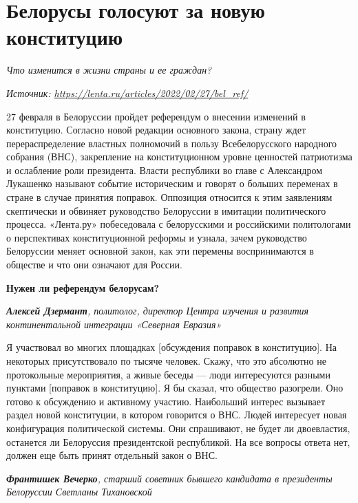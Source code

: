 
\section{Белорусы голосуют за новую конституцию}

\textit{Что изменится в жизни страны и ее граждан?}

\textit{Источник: \url{https://lenta.ru/articles/2022/02/27/bel_ref/}}

27 февраля в Белоруссии пройдет референдум о внесении изменений в конституцию. Согласно новой редакции основного закона, страну ждет перераспределение властных полномочий в пользу Всебелорусского народного собрания (ВНС), закрепление на конституционном уровне ценностей патриотизма и ослабление роли президента. Власти республики во главе с Александром Лукашенко называют событие историческим и говорят о больших переменах в стране в случае принятия поправок. Оппозиция относится к этим заявлениям скептически и обвиняет руководство Белоруссии в имитации политического процесса. «Лента.ру» побеседовала с белорусскими и российскими политологами о перспективах конституционной реформы и узнала, зачем руководство Белоруссии меняет основной закон, как эти перемены воспринимаются в обществе и что они означают для России.

\textbf{Нужен ли референдум белорусам?}

\textit{\textbf{Алексей Дзермант}, политолог, директор Центра изучения и развития континентальной интеграции «Северная Евразия»}

Я участвовал во многих площадках [обсуждения поправок в конституцию]. На некоторых присутствовало по тысяче человек. Скажу, что это абсолютно не протокольные мероприятия, а живые беседы — люди интересуются разными пунктами [поправок в конституцию]. Я бы сказал, что общество разогрели. Оно готово к обсуждению и активному участию. Наибольший интерес вызывает раздел новой конституции, в котором говорится о ВНС. Людей интересует новая конфигурация политической системы. Они спрашивают, не будет ли двоевластия, останется ли Белоруссия президентской республикой. На все вопросы ответа нет, должен еще быть принят отдельный закон о ВНС.

\textit{\textbf{Франтишек Вечерко}, старший советник бывшего кандидата в президенты Белоруссии Светланы Тихановской}

